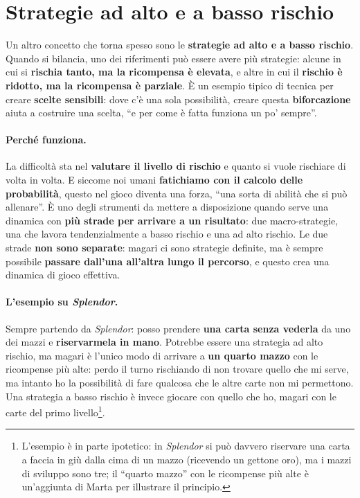 \section{Strategie ad alto e a basso rischio}
\label{a14:sec:rischio}



Un altro concetto che torna spesso sono le \textbf{strategie ad alto e a basso rischio}. Quando
si bilancia, uno dei riferimenti può essere avere più strategie: alcune in cui si
\textbf{rischia tanto, ma la ricompensa è elevata}, e altre in cui il \textbf{rischio è
ridotto, ma la ricompensa è parziale}. È un esempio tipico di tecnica per creare
\textbf{scelte sensibili}: dove c'è una sola possibilità, creare questa \textbf{biforcazione}
aiuta a costruire una scelta, ``e per come è fatta funziona un po' sempre''.

\paragraph{Perché funziona.} La difficoltà sta nel \textbf{valutare il livello di rischio} e
quanto si vuole rischiare di volta in volta. E siccome noi umani \textbf{fatichiamo con il
calcolo delle probabilità}, questo nel gioco diventa una forza, ``una sorta di abilità che si
può allenare''. È uno degli strumenti da mettere a disposizione quando serve una dinamica con
\textbf{più strade per arrivare a un risultato}: due macro-strategie, una che lavora tendenzialmente
a basso rischio e una ad alto rischio. Le due strade \textbf{non sono separate}: magari ci sono
strategie definite, ma è sempre possibile \textbf{passare dall'una all'altra lungo il
percorso}, e questo crea una dinamica di gioco effettiva.

\paragraph{L'esempio su \emph{Splendor}.} Sempre partendo da \emph{Splendor}: posso prendere
\textbf{una carta senza vederla} da uno dei mazzi e \textbf{riservarmela in mano}. Potrebbe
essere una strategia ad alto rischio, ma magari è l'unico modo di arrivare a \textbf{un quarto
mazzo} con le ricompense più alte: perdo il turno rischiando di non trovare quello che mi
serve, ma intanto ho la possibilità di fare qualcosa che le altre carte non mi permettono.
Una strategia a basso rischio è invece giocare con quello che ho, magari con le carte del
primo livello\footnote{L'esempio è in parte ipotetico: in \emph{Splendor} si può davvero
riservare una carta a faccia in giù dalla cima di un mazzo (ricevendo un gettone oro), ma i
mazzi di sviluppo sono tre; il ``quarto mazzo'' con le ricompense più alte è un'aggiunta di
Marta per illustrare il principio.}.

